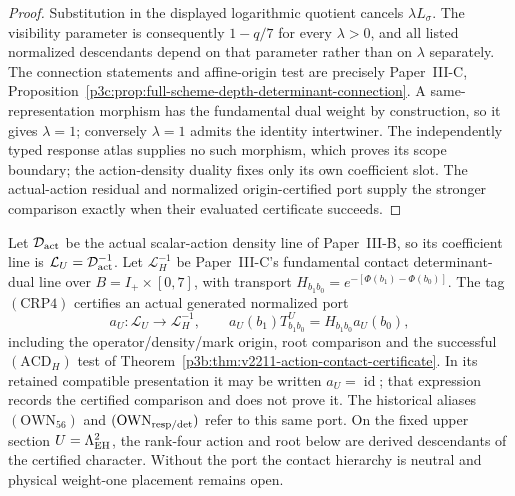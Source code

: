 \documentclass[12pt,a4paper]{article}
\begin{document}
\begin{proof}
Substitution in the displayed logarithmic quotient cancels
$\lambda L_\sigma$.  The visibility parameter is consequently $1-q/7$ for
every $\lambda>0$, and all listed normalized descendants depend on that
parameter rather than on $\lambda$ separately.  The connection statements
and affine-origin test are precisely Paper~III-C,
Proposition~\ref{p3c:prop:full-scheme-depth-determinant-connection}.  A
same-representation morphism has the fundamental dual weight by construction,
so it gives $\lambda=1$; conversely $\lambda=1$ admits the identity
intertwiner.  The independently typed response atlas supplies no such
morphism, which proves its scope boundary; the action-density duality fixes only its own coefficient slot. The
actual-action residual and normalized origin-certified port supply the
stronger comparison exactly when their evaluated certificate succeeds.
\end{proof}

\begin{definition}
\label{p3e:def:crp4-cross-role-positive-parent}
Let $\mathcal D_{\rm act}$ be the actual scalar-action density line of
Paper~III-B, so its coefficient line is
$\mathcal L_U=\mathcal D_{\rm act}^{-1}$. Let
$\mathcal L_H^{-1}$ be Paper~III-C's fundamental contact determinant-dual
line over $B=I_+\times[0,7]$, with transport
$H_{b_1b_0}=e^{-[\Phi(b_1)-\Phi(b_0)]}$.
The tag $(\mathrm{CRP4})$ certifies an actual generated normalized port
\[
 a_U:\mathcal L_U\longrightarrow\mathcal L_H^{-1},\qquad
 a_U(b_1)T^U_{b_1b_0}=H_{b_1b_0}a_U(b_0),
\]
including the operator/density/mark origin, root comparison and the successful
$(\mathrm{ACD}_H)$ test of
Theorem~\ref{p3b:thm:v2211-action-contact-certificate}. In its retained
compatible presentation it may be written $a_U=\operatorname{id}$;
that expression records the certified comparison and does not prove it.
The historical aliases $(\mathrm{OWN}_{56})$ and
$(\mathrm{OWN}_{\rm resp/det})$ refer to this same port. On the fixed
upper section $U=\Lambda_{\rm EH}^2$, the rank-four action and root below
are derived descendants of the certified character. Without the port the
contact hierarchy is neutral and physical weight-one placement remains open.
\end{definition}
\end{document}

